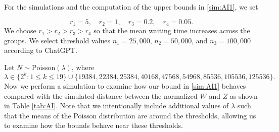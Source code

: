 \documentclass[pdflatex,sn-mathphys-ay]{sn-jnl}
\newcommand{\todoA}[1]{\todo[color=yellow!50]{#1}}
\theoremstyle{thmstyleone}%
\theoremstyle{thmstyletwo}%
\theoremstyle{thmstylethree}%
\begin{document}
        
		For the simulations and the computation of the upper bounds in \eqref{sim:AI1}, we set

		\[
		r_1 = 5, \quad 
		r_2 = 1, \quad 
		r_3 = 0.2, \quad 
		r_4 = 0.05.
		\]
We choose $r_1>r_2>r_3>r_4$  so that the mean waiting time increases across the groups. We select threshold values 
$n_1 = 25{,}000$, $n_2 = 50{,}000$, and $n_3 = 100{,}000$ according to ChatGPT.

Let \(N \sim \mathrm{Poisson}(\lambda)\), where
\[
\lambda \in \{2^k : 1 \le k \le 19\}
\cup
\{19384, 22384, 25384, 40168, 47568, 54968,
85536, 105536, 125536\}.
\]
Now we perform a simulation to examine how our bound in \eqref{sim:AI1} behaves compared with the simulated distance between the normalized $W$ and $Z$ as shown in Table \ref{tab:AI}. Note that we intentionally include additional values of $\lambda$ such that the means of the Poisson distribution are around the thresholds, allowing us to examine how the bounds behave near these thresholds.
		
\end{document}
